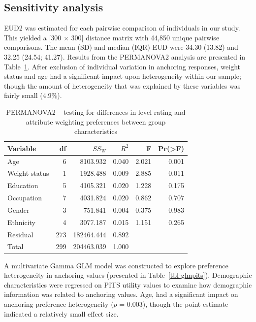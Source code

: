 \documentclass[
  letterpaper,
  DIV=11,
  numbers=noendperiod]{scrartcl}
\begin{document}
\subsection{Sensitivity analysis}\label{sensitivity-analysis-1}

EUD2 was estimated for each pairwise comparison of individuals in our
study. This yielded a {[}300 \(\times\) 300{]} distance matrix with
44,850 unique pairwise comparisons. The mean (SD) and median (IQR) EUD
were 34.30 (13.82) and 32.25 (24.54; 41.27). Results from the PERMANOVA2
analysis are presented in Table~\ref{tbl-permanova2}. After exclusion of
individual variation in anchoring responses, weight status and age had a
significant impact upon heterogeneity within our sample; though the
amount of heterogeneity that was explained by these variables was fairly
small (4.9\%).

\begin{longtable}[]{@{}lrrrrr@{}}

\caption{\label{tbl-permanova2}PERMANOVA2 -- testing for differences in
level rating and attribute weighting preferences between group
characteristics}

\tabularnewline

\toprule\noalign{}
Variable & df & \(SS_W\) & \(R^2\) & F & Pr(\textgreater F) \\
\midrule\noalign{}
\endhead
\bottomrule\noalign{}
\endlastfoot
Age & 6 & 8103.932 & 0.040 & 2.021 & 0.001 \\
Weight status & 1 & 1928.488 & 0.009 & 2.885 & 0.011 \\
Education & 5 & 4105.321 & 0.020 & 1.228 & 0.175 \\
Occupation & 7 & 4031.824 & 0.020 & 0.862 & 0.707 \\
Gender & 3 & 751.841 & 0.004 & 0.375 & 0.983 \\
Ethnicity & 4 & 3077.187 & 0.015 & 1.151 & 0.265 \\
Residual & 273 & 182464.444 & 0.892 & & \\
Total & 299 & 204463.039 & 1.000 & & \\

\end{longtable}

A multivariate Gamma GLM model was constructed to explore preference
heterogeneity in anchoring values (presented in
Table~\ref{tbl-glmpits}). Demographic characteristics were regressed on
PITS utility values to examine how demographic information was related
to anchoring values. Age, had a significant impact on anchoring
preference heterogeneity (\(p\) = 0.003), though the point estimate
indicated a relatively small effect size.
\end{document}
